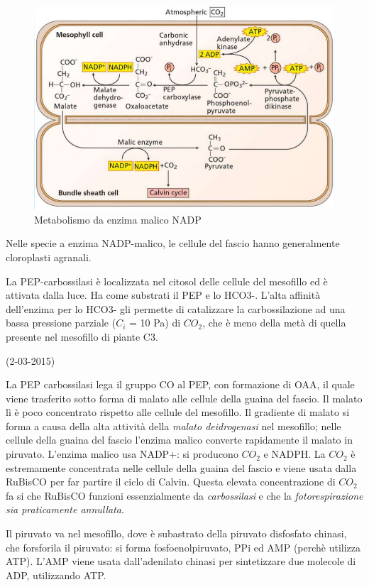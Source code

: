 \documentclass[a4paper,12pt]{book}
\begin{document}
\begin{figure}[H]
\centering
\includegraphics[scale=.3]{immagini/malico.jpg}
\caption{Metabolismo da enzima malico NADP}
\end{figure} 
Nelle specie a enzima NADP-malico, le cellule del fascio hanno generalmente cloroplasti agranali.

La PEP-carbossilasi è localizzata nel citosol delle cellule del mesofillo ed è attivata dalla luce. Ha come
substrati il PEP e lo HCO3-. L’alta affinità dell’enzima per lo HCO3- gli permette di catalizzare la
carbossilazione ad una bassa pressione parziale ($C_{i}$ = 10 Pa) di $CO_{2}$, che è meno della metà di quella
presente nel mesofillo di piante C3.

(2-03-2015)

La PEP carbossilasi lega il gruppo CO al PEP, con formazione di OAA, il quale viene trasferito sotto forma di malato alle cellule della guaina del fascio.
Il malato lì è poco concentrato rispetto alle cellule del mesofillo.  Il gradiente di malato si forma a causa della alta attività della \emph{malato deidrogenasi} nel mesofillo; nelle cellule della guaina del fascio l'enzima malico converte rapidamente il malato in piruvato. L'enzima malico usa NADP+: si producono $CO_{2}$ e NADPH. La $CO_{2}$ è estremamente concentrata nelle cellule della guaina del fascio e viene usata dalla RuBisCO per far partire il ciclo di Calvin. Questa elevata concentrazione
di $CO_{2}$ fa si che RuBisCO funzioni essenzialmente da \emph{carbossilasi} e che la \emph{fotorespirazione
sia praticamente annullata}.

Il piruvato va nel mesofillo, dove è subastrato della piruvato disfosfato chinasi, che forsforila il piruvato: si forma fosfoenolpiruvato, PPi ed AMP (perchè utilizza ATP). L'AMP viene usata dall'adenilato chinasi per sintetizzare due molecole di ADP, utilizzando ATP.
 
\end{document}
